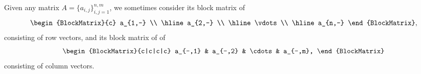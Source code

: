 \begin{definition}
  Given any matrix \( A = \{ a_{i,j} \}_{i,j=1}^{n,m} \), we sometimes consider its block matrix of 
  \begin{equation*}
    \begin{BlockMatrix}{c}
      a_{1,-} \\
      \hline
      a_{2,-} \\
      \hline
      \vdots \\
      \hline
      a_{n,-}
    \end{BlockMatrix},
  \end{equation*}
  consisting of row vectors, and its block matrix of of 
  \begin{equation*}
    \begin{BlockMatrix}{c|c|c|c}
      a_{-,1} & a_{-,2} & \cdots & a_{-,m},
    \end{BlockMatrix}
  \end{equation*}
  consisting of column vectors.
\end{definition}

